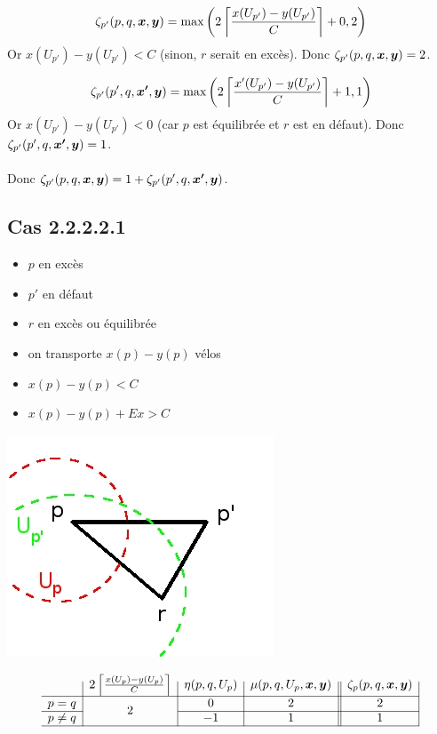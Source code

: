 \documentclass[twoside,11pt,openany,a4paper]{rapport}
\begin{document}
\[\zeta_{p'}(p,q,\boldsymbol{x},\boldsymbol{y}) = \mbox{max}\left(2 \left\lceil \frac{x(U_{p'})-y(U_{p'})}{C} \right\rceil + 0, 2\right)\]
Or $x(U_{p'})-y(U_{p'})<C$ (sinon, $r$ serait en excès).
Donc $\zeta_{p'}(p,q,\boldsymbol{x},\boldsymbol{y}) = 2$.

\[\zeta_{p'}(p',q,\boldsymbol{x'},\boldsymbol{y}) = \mbox{max}\left(2 \left\lceil \frac{x'(U_{p'})-y(U_{p'})}{C} \right\rceil + 1,1\right)\]
Or $x(U_{p'})-y(U_{p'})<0$ (car $p$ est équilibrée et $r$ est en défaut).
Donc $\zeta_{p'}(p',q,\boldsymbol{x'},\boldsymbol{y}) = 1$.
\\
\\
Donc $\zeta_{p'}(p,q,\boldsymbol{x},\boldsymbol{y}) = 1 + \zeta_{p'}(p',q,\boldsymbol{x'},\boldsymbol{y})$.

\subsection*{Cas 2.2.2.2.1}

\begin{minipage}{0.5\linewidth}
\begin{itemize}
\item $p$ en excès
\item $p'$ en défaut
\item $r$ en excès ou équilibrée
\item on transporte $x(p)-y(p)$ vélos
\item $x(p)-y(p) < C$
\item $x(p) - y(p) + Ex > C$
\end{itemize}
\end{minipage}
\begin{minipage}{0.5\linewidth}
\begin{center}
\includegraphics[scale=0.5]{graphe_triangulaire_221.jpg}
\end{center}
\end{minipage}

\begin{gather*}
  \begin{array}{c|c|c|c||c|}
    & 2 \left\lceil \frac{x(U_p)-y(U_p)}{C} \right\rceil
    & \eta(p,q,U_p)
    & \mu(p,q,U_p,\bs{x},\bs{y})
    & \zeta_p(p,q,\bs{x},\bs{y})
    \\ \hline
    p=q
    & \multirow{2}{*}{$2$}
    & 0
    & 2
    & 2
    \\ \cline{1-1}\cline{3-5}
    p \ne q
    &
    & -1
    & 1
    & 1
    \\ \hline
  \end{array}
\end{gather*}
\end{document}
